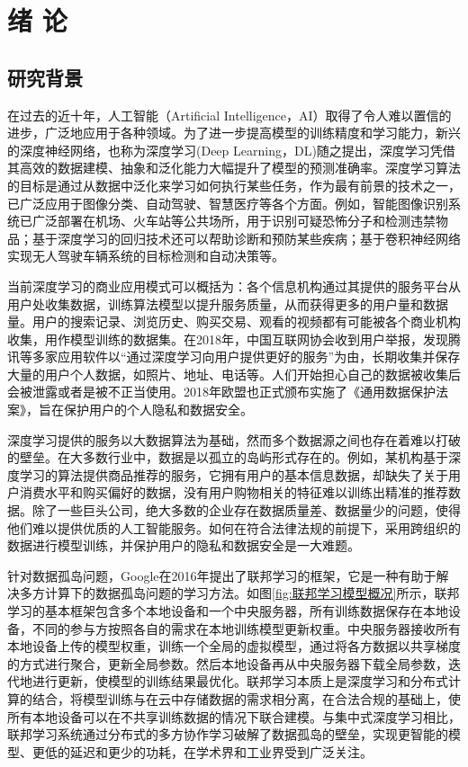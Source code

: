 \chapter{绪\hskip 0.4cm 论}
\label{ch1}

\section{研究背景}
在过去的近十年，人工智能（Artificial Intelligence，AI）取得了令人难以置信的进步，广泛地应用于各种领域。为了进一步提高模型的训练精度和学习能力，新兴的深度神经网络，也称为深度学习(Deep Learning，DL)随之提出，深度学习凭借其高效的数据建模、抽象和泛化能力大幅提升了模型的预测准确率。深度学习算法的目标是通过从数据中泛化来学习如何执行某些任务，作为最有前景的技术之一，已广泛应用于图像分类、自动驾驶、智慧医疗等各个方面。例如，智能图像识别系统已广泛部署在机场、火车站等公共场所，用于识别可疑恐怖分子和检测违禁物品；基于深度学习的回归技术还可以帮助诊断和预防某些疾病；基于卷积神经网络实现无人驾驶车辆系统的目标检测和自动决策等。

当前深度学习的商业应用模式可以概括为：各个信息机构通过其提供的服务平台从用户处收集数据，训练算法模型以提升服务质量，从而获得更多的用户量和数据量。用户的搜索记录、浏览历史、购买交易、观看的视频都有可能被各个商业机构收集，用作模型训练的数据集。在2018年，中国互联网协会收到用户举报，发现腾讯等多家应用软件以“通过深度学习向用户提供更好的服务”为由，长期收集并保存大量的用户个人数据，如照片、地址、电话等。人们开始担心自己的数据被收集后会被泄露或者是被不正当使用。2018年欧盟也正式颁布实施了《通用数据保护法案》，旨在保护用户的个人隐私和数据安全。

深度学习提供的服务以大数据算法为基础，然而多个数据源之间也存在着难以打破的壁垒。在大多数行业中，数据是以孤立的岛屿形式存在的。例如，某机构基于深度学习的算法提供商品推荐的服务，它拥有用户的基本信息数据，却缺失了关于用户消费水平和购买偏好的数据，没有用户购物相关的特征难以训练出精准的推荐数据。除了一些巨头公司，绝大多数的企业存在数据质量差、数据量少的问题，使得他们难以提供优质的人工智能服务。如何在符合法律法规的前提下，采用跨组织的数据进行模型训练，并保护用户的隐私和数据安全是一大难题。

针对数据孤岛问题，Google在2016年提出了联邦学习的框架，它是一种有助于解决多方计算下的数据孤岛问题的学习方法。如图\ref{fig:联邦学习模型概况}所示，联邦学习的基本框架包含多个本地设备和一个中央服务器，所有训练数据保存在本地设备，不同的参与方按照各自的需求在本地训练模型更新权重。中央服务器接收所有本地设备上传的模型权重，训练一个全局的虚拟模型，通过将各方数据以共享梯度的方式进行聚合，更新全局参数。然后本地设备再从中央服务器下载全局参数，迭代地进行更新，使模型的训练结果最优化。联邦学习本质上是深度学习和分布式计算的结合，将模型训练与在云中存储数据的需求相分离，在合法合规的基础上，使所有本地设备可以在不共享训练数据的情况下联合建模。与集中式深度学习相比，联邦学习系统通过分布式的多方协作学习破解了数据孤岛的壁垒，实现更智能的模型、更低的延迟和更少的功耗，在学术界和工业界受到广泛关注。

